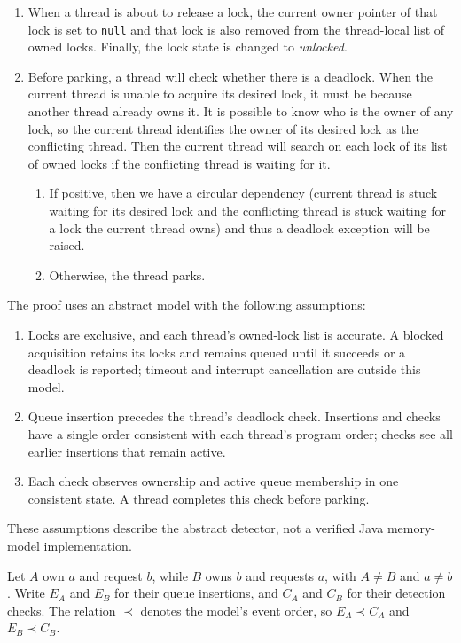 \begin{enumerate}
\item When a thread is about to release a lock, the current owner pointer of that lock is set to {\tt null} and that lock is also removed from the thread-local list of owned locks. Finally, the lock state is changed to \emph{unlocked}.
\item Before parking, a thread will check whether there is a deadlock. When the current thread is unable to acquire its desired lock, it must be because another thread already owns it. It is possible to know who is the owner of any lock, so the current thread identifies the owner of its desired lock as the conflicting thread. Then the current thread will search on each lock of its list of owned locks if the conflicting thread is waiting for it.
\begin{enumerate}
\item If positive, then we have a circular dependency (current thread is stuck waiting for its desired lock and the conflicting thread is stuck waiting for a lock the current thread owns) and thus a deadlock exception will be raised.
\item Otherwise, the thread parks.
\end{enumerate}
\end{enumerate}

The proof uses an abstract model with the following assumptions:
\begin{enumerate}
\item Locks are exclusive, and each thread's owned-lock list is accurate. A blocked acquisition retains its locks and remains queued until it succeeds or a deadlock is reported; timeout and interrupt cancellation are outside this model.
\item Queue insertion precedes the thread's deadlock check. Insertions and checks have a single order consistent with each thread's program order; checks see all earlier insertions that remain active.
\item Each check observes ownership and active queue membership in one consistent state. A thread completes this check before parking.
\end{enumerate}
These assumptions describe the abstract detector, not a verified Java memory-model implementation.

Let $A$ own $a$ and request $b$, while $B$ owns $b$ and requests $a$, with $A \ne B$ and $a \ne b$.
Write $E_A$ and $E_B$ for their queue insertions, and $C_A$ and $C_B$ for their detection checks.
The relation $\prec$ denotes the model's event order, so $E_A \prec C_A$ and $E_B \prec C_B$.

